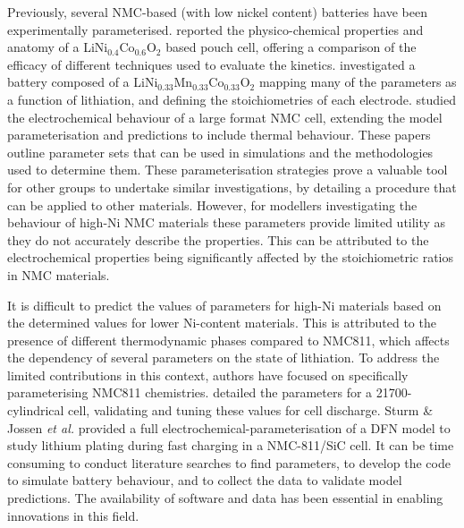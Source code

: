 \documentclass[aps,prb,twocolumn,superscriptaddress,reprint]{revtex4-1}
\begin{document}
Previously, several NMC-based (with low nickel content) batteries have been experimentally parameterised. \cite{Ecker2015,Schmalstieg_Rahe_Ecker_Sauer_2018,Liebig_2019}  \citeauthor{Ecker2015} reported the physico-chemical properties and anatomy of a LiNi$_{0.4}$Co$_{0.6}$O$_2$ based pouch cell, offering a comparison of the efficacy of different techniques used to evaluate the kinetics. \cite{Ecker2015} \citeauthor{Schmalstieg_Rahe_Ecker_Sauer_2018} investigated a battery composed of a LiNi$_{0.33}$Mn$_{0.33}$Co$_{0.33}$O$_2$ mapping many of the parameters as a function of lithiation, and defining the stoichiometries of each electrode. \cite{Schmalstieg_Rahe_Ecker_Sauer_2018} \citeauthor{Liebig_2019} studied the electrochemical behaviour of a large format NMC cell, extending the model parameterisation and predictions to include thermal behaviour. \cite{Liebig_2019}  These papers outline parameter sets that can be used in simulations and the methodologies used to determine them. These parameterisation strategies prove a valuable tool for other groups to undertake similar investigations, by detailing a procedure that can be applied to other materials. However, for modellers investigating the behaviour of high-Ni NMC materials these parameters provide limited utility as they do not accurately describe the properties. This can be attributed to the electrochemical properties being significantly affected by the stoichiometric ratios in NMC materials.\cite{noh2013comparison} 

It is difficult to predict the values of parameters for high-Ni materials based on the determined values for lower Ni-content materials.\cite{Amin_Chiang_2016} This is attributed to the presence of different thermodynamic phases compared to NMC811, which affects the dependency of several parameters on the state of lithiation. \cite{jung2017oxygen} To address the limited contributions in this context, authors have focused on specifically parameterising NMC811 chemistries. \citeauthor{Chen2020} detailed the parameters for a 21700-cylindrical cell, validating and tuning these values for cell discharge.\cite{Chen2020}  Sturm \& Jossen \textit{et al.} provided a full electrochemical-parameterisation of a DFN model to study lithium plating during fast charging in a NMC-811/SiC cell. \cite{Jossen2019,Sturm2019} It can be time consuming to conduct literature searches to find parameters, to develop the code to simulate battery behaviour, and to collect the data to validate model predictions. The availability of software and data has been essential in enabling innovations in this field.
\end{document}
